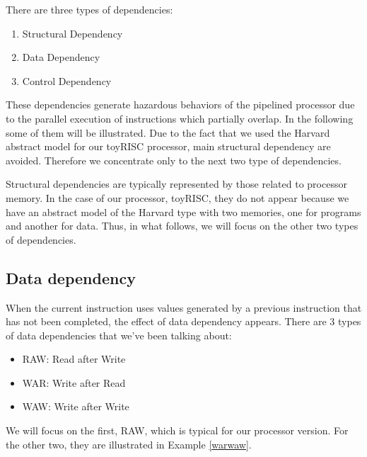 
There are three types of dependencies:
\begin{enumerate}
\item Structural Dependency
\item Data Dependency
\item Control Dependency
\end{enumerate}

These dependencies generate hazardous behaviors of the pipelined processor due to the parallel execution of instructions which partially overlap. In the following some of them will be illustrated. Due to the fact that we used the Harvard abstract model for our toyRISC processor, main structural dependency are avoided. Therefore we concentrate only to the next two type of dependencies.

Structural dependencies are typically represented by those related to processor memory. In the case of our processor, toyRISC, they do not appear because we have an abstract model of the Harvard type with two memories, one for programs and another for data. Thus, in what follows, we will focus on the other two types of dependencies.

\subsection{Data dependency}

When the current instruction uses values generated by a previous instruction that has not been completed, the effect of data dependency appears. There are 3 types of data dependencies that
we’ve been talking about:
\begin{itemize}
\item RAW: Read after Write
\item WAR: Write after Read
\item WAW: Write after Write
\end{itemize}
We will focus on the first, RAW, which is typical for our processor version. For the other two, they are illustrated in Example \ref{warwaw}.

